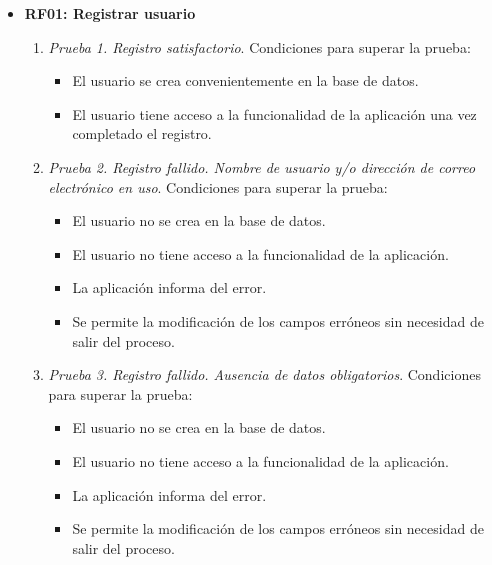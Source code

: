 \begin{itemize}
	\item \textbf{RF01: Registrar usuario}
	\begin{enumerate}
		\item \textit{Prueba 1. Registro satisfactorio}. Condiciones para superar la prueba:
		\begin{itemize}
			\item El usuario se crea convenientemente en la base de datos.
			\item El usuario tiene acceso a la funcionalidad de la aplicación una vez completado el registro.
		\end{itemize}
		\item \textit{Prueba 2. Registro fallido. Nombre de usuario y/o dirección de correo electrónico en uso}. Condiciones para superar la prueba:
		\begin{itemize}
			\item El usuario no se crea en la base de datos.
			\item El usuario no tiene acceso a la funcionalidad de la aplicación.
			\item La aplicación informa del error.
			\item Se permite la modificación de los campos erróneos sin necesidad de salir del proceso.
		\end{itemize}
		\item \textit{Prueba 3. Registro fallido. Ausencia de datos obligatorios}. Condiciones para superar la prueba:
		\begin{itemize}
			\item El usuario no se crea en la base de datos.
			\item El usuario no tiene acceso a la funcionalidad de la aplicación.
			\item La aplicación informa del error.
			\item Se permite la modificación de los campos erróneos sin necesidad de salir del proceso.
		\end{itemize}
	\end{enumerate}
	

\end{itemize}

